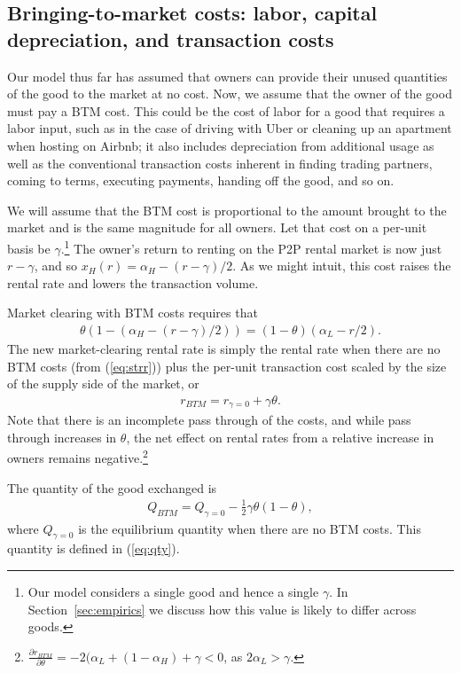 \documentclass[12pt]{article}
\begin{document}
\subsection{Bringing-to-market costs: labor, capital depreciation, and transaction costs}

Our model thus far has assumed that owners can provide their unused quantities of the good to the market at no cost. 
Now, we assume that the owner of the good must pay a BTM cost. 
This could be the cost of labor for a good that requires a labor input, such as in the case of driving with Uber or cleaning up an apartment when hosting on Airbnb;
it also includes depreciation from additional usage as well as the conventional transaction costs inherent in finding trading partners, coming to terms, executing payments, handing off the good, and so on.  

We will assume that the BTM cost is proportional to the amount brought to the market and is the same magnitude for all owners.
Let that cost on a per-unit basis be $\gamma$.\footnote{
  Our model considers a single good and hence a single $\gamma$.
  In Section~\ref{sec:empirics} we discuss how this value is likely to differ across goods. 
  }
The owner's return to renting on the P2P rental market is now just $r - \gamma$, and so $x_H(r) = \alpha_H - (r - \gamma)/2$.
As we might intuit, this cost raises the rental rate and lowers the transaction volume. 

Market clearing with BTM costs requires that 
\begin{align}
  \theta (1 - (\alpha_H - (r-\gamma)/2)) = (1-\theta)(\alpha_L - r/2).
\end{align}
The new market-clearing rental rate is simply the rental rate when there are no BTM costs (from (\ref{eq:strr})) plus the per-unit transaction cost scaled by the size of the supply side of the market, or  
\begin{align} \label{eq:rental_rate_sr_bmc}
  r_{BTM} = r_{\gamma = 0} + \gamma \theta. 
\end{align}
Note that there is an incomplete pass through of the costs, and while pass through increases in $\theta$, the net effect on rental rates from a relative increase in owners remains negative.\footnote{
  $\frac{\partial r_{BTM}}{\partial \theta} = -2(\alpha_L + (1-\alpha_H) + \gamma < 0$, as $2\alpha_L > \gamma$.}

The quantity of the good exchanged is
\begin{align} \label{eq:qty_gamma}
  Q_{BTM} = Q_{\gamma = 0} - \frac{1}{2} \gamma \theta (1-\theta),
\end{align} 
where $Q_{\gamma = 0}$ is the equilibrium quantity when there are no BTM costs.
This quantity is defined in (\ref{eq:qty}). 
\end{document}
